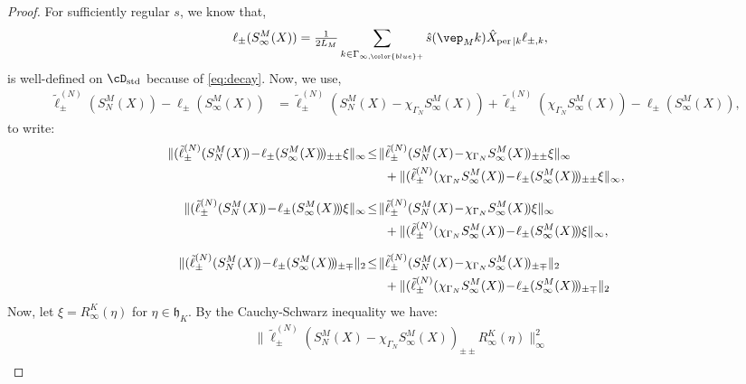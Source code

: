 \documentclass[a4paper, 11pt]{article}
\newcommand{\fh}{\mathfrak{h}}
\DeclareMathOperator{\1}{\mathds{1}}
\DeclareMathOperator{\std}{std}
\DeclareMathOperator{\per}{per}
\begin{document}
\begin{proof}
For sufficiently regular $s$, we know that,
\begin{align*}
\ell_{\pm}(S^{M}_{\infty}(X)) & = \tfrac{1}{2L_{M}}\sum_{k\in\Gamma_{\infty,{\color{blue}+}}}\hat{s}(\vep_{M}k)\hat{X}_{\per|k}\ell_{\pm,k},
\end{align*}
is well-defined on $\cD_{\std}$ because of \eqref{eq:decay}. Now, we use,
\begin{align*}
\tilde{\ell}^{(N)}_{\pm}(S^{M}_{N}(X)\!)\!-\!\ell_{\pm}(S^{M}_{\infty}(X)\!) & \!=\!\tilde{\ell}^{(N)}_{\pm}(S^{M}_{N}(X)\!-\!\chi_{\Gamma_{N}}S^{M}_{\infty}(X)\!)\!+\!\tilde{\ell}^{(N)}_{\pm}(\chi_{\Gamma_{N}}S^{M}_{\infty}(X)\!)\!-\!\ell_{\pm}(S^{M}_{\infty}(X)\!),
\end{align*}
to write:
\begin{align*}
\|(\tilde{\ell}^{(N)}_{\pm}(S^{M}_{N}(X)\!)\!-\!\ell_{\pm}(S^{M}_{\infty}(X)\!)\!)_{\pm\pm}\xi\|_{\infty} & \!\leq\!\|\tilde{\ell}^{(N)}_{\pm}(S^{M}_{N}(X)\!-\!\chi_{\Gamma_{N}}S^{M}_{\infty}(X)\!)_{\pm\pm}\xi\|_{\infty} \\
& \hspace{0.5cm} + \|(\tilde{\ell}^{(N)}_{\pm}(\chi_{\Gamma_{N}}S^{M}_{\infty}(X)\!)\!-\!\ell_{\pm}(S^{M}_{\infty}(X)\!)\!)_{\pm\pm}\xi\|_{\infty}, \\[0.25cm]
\|(\tilde{\ell}^{(N)}_{\pm}(S^{M}_{N}(X)\!)\!-\!\ell_{\pm}(S^{M}_{\infty}(X)\!)\!)\xi\|_{\infty} & \!\leq\!\|\tilde{\ell}^{(N)}_{\pm}(S^{M}_{N}(X)\!-\!\chi_{\Gamma_{N}}S^{M}_{\infty}(X)\!)\xi\|_{\infty} \\
& \hspace{0.5cm} + \|(\tilde{\ell}^{(N)}_{\pm}(\chi_{\Gamma_{N}}S^{M}_{\infty}(X)\!)\!-\!\ell_{\pm}(S^{M}_{\infty}(X)\!)\!)\xi\|_{\infty}, \\[0.25cm]
\|(\tilde{\ell}^{(N)}_{\pm}(S^{M}_{N}(X)\!)\!-\!\ell_{\pm}(S^{M}_{\infty}(X)\!)\!)_{\pm\mp}\|_{2} & \!\leq\!\|\tilde{\ell}^{(N)}_{\pm}(S^{M}_{N}(X)\!-\!\chi_{\Gamma_{N}}S^{M}_{\infty}(X)\!)_{\pm\mp}\|_{2} \\
& \hspace{0.5cm} + \|(\tilde{\ell}^{(N)}_{\pm}(\chi_{\Gamma_{N}}S^{M}_{\infty}(X)\!)\!-\!\ell_{\pm}(S^{M}_{\infty}(X)\!)\!)_{\pm\mp}\|_{2}
\end{align*}
Now, let $\xi = R^{K}_{\infty}(\eta)$ for $\eta\in\fh_{K}$. By the Cauchy-Schwarz inequality we have:
\begin{align*}
 & \|\tilde{\ell}^{(N)}_{\pm}(S^{M}_{N}(X)\!-\!\chi_{\Gamma_{N}}S^{M}_{\infty}(X)\!)_{\pm\pm}R^{K}_{\infty}(\eta)\|_{\infty}^{2} \\

\end{align*}
\end{proof}
\end{document}
